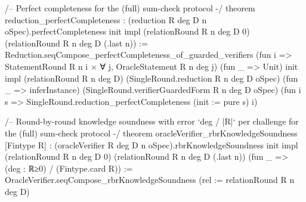 \begin{leancode}

/-- Perfect completeness for the (full) sum-check protocol -/
theorem reduction_perfectCompleteness :
    (reduction R deg D n oSpec).perfectCompleteness init impl
      (relationRound R n deg D 0) (relationRound R n deg D (.last n)) :=
  Reduction.seqCompose_perfectCompleteness_of_guarded_verifiers
    (fun i => StatementRound R n i × ∀ j, OracleStatement R n deg j)
    (fun _ => Unit) init impl (relationRound R n deg D)
    (SingleRound.reduction R n deg D oSpec)
    (fun _ => inferInstance) (SingleRound.verifierGuardedForm R n deg D oSpec)
    (fun i s => SingleRound.reduction_perfectCompleteness (init := pure s) i)

/-- Round-by-round knowledge soundness with error `deg / |R|` per challenge for the (full)
  sum-check protocol -/
theorem oracleVerifier_rbrKnowledgeSoundness [Fintype R] :
    (oracleVerifier R deg D n oSpec).rbrKnowledgeSoundness init impl
      (relationRound R n deg D 0) (relationRound R n deg D (.last n))
      (fun _ => (deg : ℝ≥0) / (Fintype.card R)) :=
  OracleVerifier.seqCompose_rbrKnowledgeSoundness
    (rel := relationRound R n deg D)
\end{leancode}


\par\endgroup